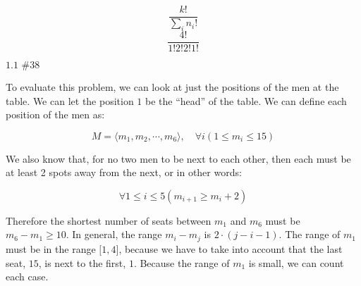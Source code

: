 \documentclass{article}
\newcommand{\problem}[2]{$\boxed{\text{#1 \##2}}$}
\newcommand{\solution}[1]{\boxed{#1}}
\begin{document}
\begin{multicols*}{2}
\[
\dfrac{k!}{\sum\limits_i n_i!}
\] \[
\solution{\dfrac{4!}{1!2!2!1!}}
\]

%
\problem{1.1}{38}

To evaluate this problem, we can look at just the positions of the men
at the table. We can let the position $1$ be the ``head'' of the
table. We can define each position of the men as:

\[
M=\langle m_1, m_2, \cdots, m_6\rangle,\quad \forall i(1\le m_i\le 15)
\]

We also know that, for no two men to be next to each other, then each
must be at least 2 spots away from the next, or in other words:

\[
\forall 1\le i\le 5(m_{i+1}\ge m_i+2)
\]

Therefore the shortest number of seats between $m_1$ and $m_6$ must be
$m_6-m_1\ge10$. In general, the range $m_i-m_j$ is $2\cdot(j-i-1)$.
The range of $m_1$ must be in the range $\lbrack1,4\rbrack$, because
we have to take into account that the last seat, $15$, is next to the
first, $1$. Because the range of $m_1$ is small, we can count each
case.

\end{multicols*}
\end{document}
